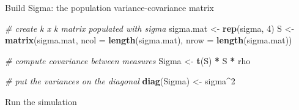 \documentclass[]{book}
\newenvironment{Shaded}{\begin{snugshade}}{\end{snugshade}}
\newcommand{\CommentTok}[1]{\textcolor[rgb]{0.56,0.35,0.01}{\textit{#1}}}
\newcommand{\DataTypeTok}[1]{\textcolor[rgb]{0.13,0.29,0.53}{#1}}
\newcommand{\DecValTok}[1]{\textcolor[rgb]{0.00,0.00,0.81}{#1}}
\newcommand{\KeywordTok}[1]{\textcolor[rgb]{0.13,0.29,0.53}{\textbf{#1}}}
\newcommand{\NormalTok}[1]{#1}
\newcommand{\OperatorTok}[1]{\textcolor[rgb]{0.81,0.36,0.00}{\textbf{#1}}}
\newcommand{\StringTok}[1]{\textcolor[rgb]{0.31,0.60,0.02}{#1}}
\begin{document}
Build Sigma: the population variance-covariance matrix

\begin{Shaded}
\begin{Highlighting}[]
\CommentTok{# create k x k matrix populated with sigma}
\NormalTok{sigma.mat <-}\StringTok{ }\KeywordTok{rep}\NormalTok{(sigma, }\DecValTok{4}\NormalTok{)}
\NormalTok{S <-}
\StringTok{  }\KeywordTok{matrix}\NormalTok{(sigma.mat,}
  \DataTypeTok{ncol =} \KeywordTok{length}\NormalTok{(sigma.mat),}
  \DataTypeTok{nrow =} \KeywordTok{length}\NormalTok{(sigma.mat))}
 
\CommentTok{# compute covariance between measures}
\NormalTok{Sigma <-}\StringTok{ }\KeywordTok{t}\NormalTok{(S) }\OperatorTok{*}\StringTok{ }\NormalTok{S }\OperatorTok{*}\StringTok{ }\NormalTok{rho  }
 
\CommentTok{# put the variances on the diagonal }
\KeywordTok{diag}\NormalTok{(Sigma) <-}\StringTok{ }\NormalTok{sigma}\OperatorTok{^}\DecValTok{2}  
\end{Highlighting}
\end{Shaded}

Run the simulation
\end{document}
